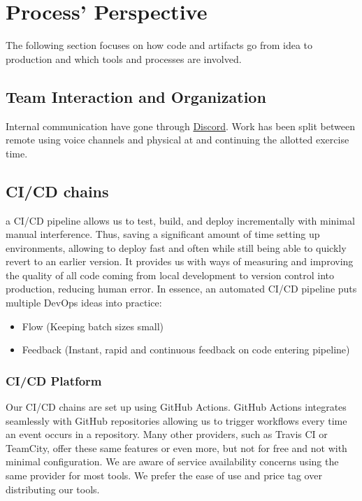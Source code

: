 \section{Process' Perspective}
\label{sec:processPerspective}
The following section focuses on how code and artifacts go from idea to production and which tools and processes are involved.
\subsection{Team Interaction and Organization}
\label{subsec:TeamInteraction}
Internal communication have gone through \href{https://discord.com/}{Discord}. Work has been split between remote using voice channels and physical at and continuing the allotted exercise time.
\subsection{CI/CD chains}
\label{subsec:cicd}
a CI/CD pipeline allows us to test, build, and deploy \mini incrementally with minimal manual interference. Thus, saving a significant amount of time setting up environments, allowing to deploy fast and often while still being able to quickly revert to an earlier version.
It provides us with ways of measuring and improving the quality of all code coming from local development to version control into production, reducing human error.\cite{Chen2015}
In essence, an automated CI/CD pipeline puts multiple DevOps ideas into practice: 
\begin{itemize}
    \item Flow (Keeping batch sizes small)\cite{Kim2016}
    \item Feedback (Instant, rapid and continuous feedback on code entering pipeline)\cite{Kim2016}
\end{itemize}


\subsubsection{CI/CD Platform}
\label{subsubsec:cicdPlatform}
Our CI/CD chains are set up using GitHub Actions. GitHub Actions integrates seamlessly with GitHub repositories allowing us to trigger workflows every time an event occurs in a repository\cite{githubActions}. Many other providers, such as Travis CI or TeamCity, offer these same features or even more, but not for free and not with minimal configuration. We are aware of service availability concerns using the same provider for most tools. We prefer the ease of use and price tag over distributing our tools.

